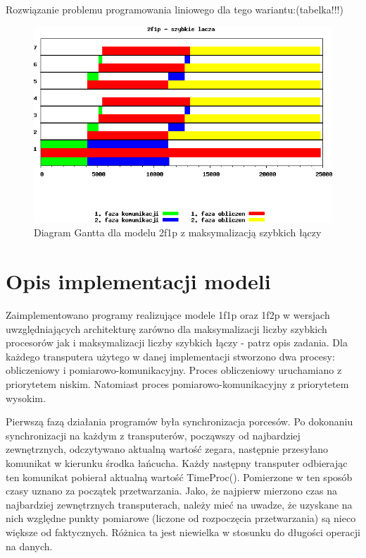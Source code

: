 \documentclass[a4paper,11pt, titlepage]{article}
\begin{document}
Rozwiązanie problemu programowania liniowego dla tego wariantu:(tabelka!!!)
\begin{figure}[htp!]
\includegraphics[width=1.0\textwidth]{wykresy/1p2f_lacza}
\caption{Diagram Gantta dla modelu 2f1p z maksymalizacją szybkich łączy \label{1p2f_l}}
\end{figure}

\section{Opis implementacji modeli}
Zaimplementowano programy realizujące modele 1f1p oraz 1f2p w wersjach uwzględniających architekturę zarówno dla maksymalizacji liczby szybkich procesorów jak i maksymalizacji liczby szybkich łączy - patrz opis zadania. Dla każdego transputera użytego w danej implementacji stworzono dwa procesy: obliczeniowy i pomiarowo-komunikacyjny. Proces obliczeniowy uruchamiano z priorytetem niskim. Natomiast proces pomiarowo-komunikacyjny z priorytetem wysokim.

Pierwszą fazą działania programów była synchronizacja porcesów. Po dokonaniu synchronizacji na każdym z transputerów, począwszy od najbardziej zewnętrznych, odczytywano aktualną wartość zegara, następnie przesyłano komunikat w kierunku środka łańcucha. Każdy następny transputer odbierając ten komunikat pobierał aktualną wartość TimeProc(). Pomierzone w ten sposób czasy uznano za początek przetwarzania. Jako, że najpierw mierzono czas na najbardziej zewnętrznych transputerach, należy mieć na uwadze, że uzyskane na nich względne punkty pomiarowe (liczone od rozpoczęcia przetwarzania) są nieco większe od faktycznych. Różnica ta jest niewielka w stosunku do długości operacji na danych.
\end{document}
